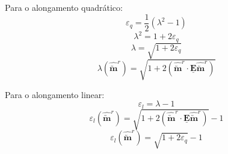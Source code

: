 Para o alongamento quadrático:
\[\varepsilon_q=\frac{1}{2}(\lambda^2-1)\]
\[\lambda^2=1+2\varepsilon_q\]
\[\lambda=\sqrt{1+2\varepsilon_q}\]
\[\lambda(\hat{\utilde{\mathbf{m}}}^r)=\sqrt{1+2(\hat{\utilde{\mathbf{m}}}^r\cdot\underline{\mathbf{E}}\hat{\utilde{\mathbf{m}}}^r)}\]

Para o alongamento linear:
\[\varepsilon_l=\lambda-1\]
\[\varepsilon_l(\hat{\utilde{\mathbf{m}}}^r)=\sqrt{1+2(\hat{\utilde{\mathbf{m}}}^r\cdot\underline{\mathbf{E}}\hat{\utilde{\mathbf{m}}}^r)}-1\]
\[\varepsilon_l(\hat{\utilde{\mathbf{m}}}^r)=\sqrt{1+2\varepsilon_q}-1\]